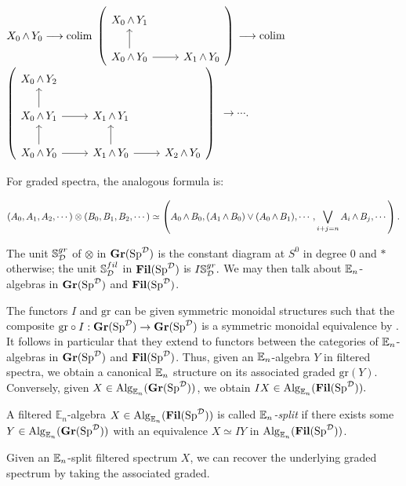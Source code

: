 \begin{center}
$X_0 \smsh Y_0 \longrightarrow \colim $
{$ \left(\begin{tikzcd} X_0 \smsh Y_1 \\  X_0 \smsh Y_0 \arrow{u} \arrow{r} & X_1 \smsh Y_0 \end{tikzcd} \right) $} 
$\longrightarrow \colim$
 {$ \left( \begin{tikzcd} X_0 \smsh Y_2 \\ X_0 \smsh Y_1 \arrow{r} \arrow{u} & X_1 \smsh Y_1  \\ X_0 \smsh Y_0 \arrow{r} \arrow{u} & X_1 \smsh Y_0 \arrow{u} \arrow{r} & X_2 \smsh Y_0 \end{tikzcd} \right) $}
$\longrightarrow \cdots.$
\end{center}

For graded spectra, the analogous formula is:

$$(A_0,A_1,A_2,\cdots) \otimes (B_0,B_1,B_2,\cdots) \simeq \left( A_0 \smsh B_0, (A_1 \smsh B_0) \vee (A_0 \smsh B_1), \cdots, \bigvee_{i+j=n} A_i \smsh B_j, \cdots \right).$$


The unit $\mathbb{S}^{gr}_{\D}$ of $\otimes$ in $\Gr(\Sp^{\D})$ is the constant diagram at $S^0$ in degree 0 and $*$ otherwise; the unit $\mathbb{S}^{fil}_{\D}$ in $\Fil(\Sp^{\D})$ is $I\mathbb{S}^{gr}_{\D}.$  We may then talk about $\E_n$-algebras in $\Gr(\Sp^{\D})$ and $\Fil(\Sp^{\D})$.  


The functors $I$ and $\text{gr}$ can be given symmetric monoidal structures such that the composite $\text{gr}\circ I : \Gr(\Sp^{\D}) \to \Gr(\Sp^{\D})$ is a symmetric monoidal equivalence by \cite[Proposition 3.2.1]{LurieRot}.  It follows in particular that they extend to functors between the categories of $\E_n$-algebras in $\Gr(\Sp^{\D})$ and $\Fil(\Sp^{\D})$.  Thus, given an $\E_n$-algebra $Y$ in filtered spectra, we obtain a canonical $\E_n$ structure on its associated graded $\text{gr}(Y).$  Conversely, given $X\in \Alg_{\E_n}(\Gr(\Sp^{\D}))$, we obtain $IX\in \Alg_{\E_n}(\Fil(\Sp^{\D})).$  

\begin{dfn}
A filtered $\mathbb{E}_n$-algebra $X\in \Alg_{\E_n}(\Fil(\Sp^{\D}))$ is called \emph{$\E_n$-split} if there exists some $Y \in \Alg_{\E_n}(\Gr(\Sp^{\D}))$ with an equivalence $X \simeq IY$ in $\Alg_{\E_n}(\Fil(\Sp^{\D}))$.  
\end{dfn}

Given an $\E_n$-split filtered spectrum $X$, we can recover the underlying graded spectrum by taking the associated graded.  

